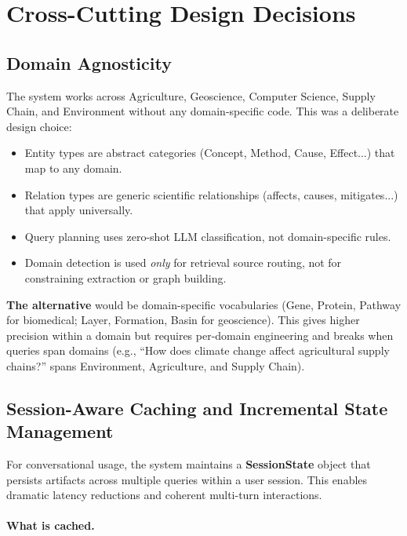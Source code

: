 \documentclass[11pt]{article}
\begin{document}
\section{Cross-Cutting Design Decisions}

\subsection{Domain Agnosticity}

The system works across Agriculture, Geoscience, Computer Science, Supply Chain, and Environment without any domain-specific code. This was a deliberate design choice:

\begin{itemize}[leftmargin=1.2em]
  \item Entity types are abstract categories (Concept, Method, Cause, Effect...) that map to any domain.
  \item Relation types are generic scientific relationships (affects, causes, mitigates...) that apply universally.
  \item Query planning uses zero-shot LLM classification, not domain-specific rules.
  \item Domain detection is used \emph{only} for retrieval source routing, not for constraining extraction or graph building.
\end{itemize}

\textbf{The alternative} would be domain-specific vocabularies (Gene, Protein, Pathway for biomedical; Layer, Formation, Basin for geoscience). This gives higher precision within a domain but requires per-domain engineering and breaks when queries span domains (e.g., ``How does climate change affect agricultural supply chains?'' spans Environment, Agriculture, and Supply Chain).

\subsection{Session-Aware Caching and Incremental State Management}

For conversational usage, the system maintains a \textbf{SessionState} object that persists artifacts across multiple queries within a user session. This enables dramatic latency reductions and coherent multi-turn interactions.

\paragraph{What is cached.}
\end{document}

